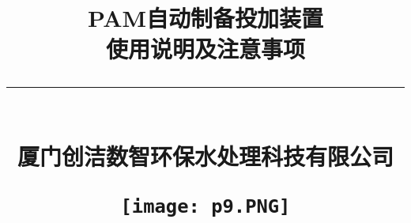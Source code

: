 \title{
    PAM自动制备投加装置\\[2.5mm]
    使用说明及注意事项\\
   {\noindent}\rule{16cm}{1pt}\\[3mm]
    厦门创洁数智环保水处理科技有限公司\\
   \begin{figure}[h]
      \centering
      \texttt{[image: p9.PNG]}
   \end{figure}
}

\maketitle %

